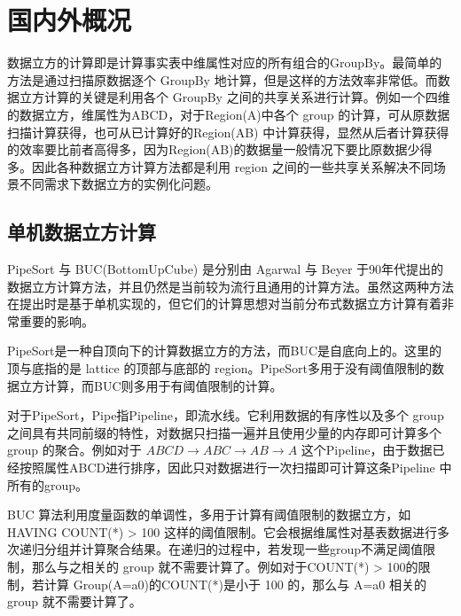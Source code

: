 


\section{国内外概况}

数据立方的计算即是计算事实表中维属性对应的所有组合的GroupBy。最简单的方法是通过扫描原数据逐个 GroupBy 地计算，但是这样的方法效率非常低。而数据立方计算的关键是利用各个 GroupBy 之间的共享关系进行计算。例如一个四维的数据立方，维属性为ABCD，对于Region(A)中各个 group 的计算，可从原数据扫描计算获得，也可从已计算好的Region(AB) 中计算获得，显然从后者计算获得的效率要比前者高得多，因为Region(AB)的数据量一般情况下要比原数据少得多。因此各种数据立方计算方法都是利用 region 之间的一些共享关系解决不同场景不同需求下数据立方的实例化问题。\cite{morfonios2007rolap}


\subsection{单机数据立方计算}

PipeSort\cite{agarwal1996computation} 与 BUC(BottomUpCube)\cite{beyer1999bottom} 是分别由 Agarwal 与 Beyer 于90年代提出的数据立方计算方法，并且仍然是当前较为流行且通用的计算方法。虽然这两种方法在提出时是基于单机实现的，但它们的计算思想对当前分布式数据立方计算有着非常重要的影响。

PipeSort是一种自顶向下的计算数据立方的方法，而BUC是自底向上的。这里的顶与底指的是 lattice 的顶部与底部的 region。PipeSort多用于没有阈值限制的数据立方计算，而BUC则多用于有阈值限制的计算。

对于PipeSort，Pipe指Pipeline，即流水线。它利用数据的有序性以及多个 group 之间具有共同前缀的特性，对数据只扫描一遍并且使用少量的内存即可计算多个 group 的聚合。例如对于 $ABCD\rightarrow ABC\rightarrow AB\rightarrow A$ 这个Pipeline，由于数据已经按照属性ABCD进行排序，因此只对数据进行一次扫描即可计算这条Pipeline 中所有的group。

BUC 算法利用度量函数的单调性，多用于计算有阈值限制的数据立方，如HAVING COUNT(*) > 100 这样的阈值限制。它会根据维属性对基表数据进行多次递归分组并计算聚合结果。在递归的过程中，若发现一些group不满足阈值限制，那么与之相关的 group 就不需要计算了。例如对于COUNT(*) > 100的限制，若计算 Group(A=a0)的COUNT(*)是小于 100 的，那么与 A=a0 相关的 group 就不需要计算了。

